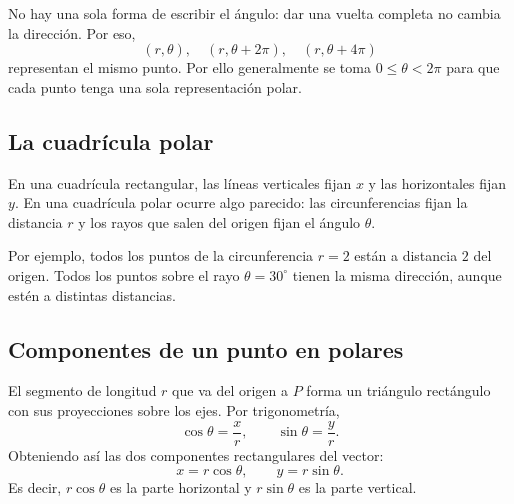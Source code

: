 No hay una sola forma de escribir el ángulo: dar una vuelta completa no cambia la dirección. Por eso,
\[
(r,\theta),\quad (r,\theta+2\pi),\quad (r,\theta+4\pi)
\]
representan el mismo punto. Por ello generalmente se toma $0\leq\theta<2\pi$ para que cada punto tenga una sola representación polar.

\subsection{La cuadrícula polar}

En una cuadrícula rectangular, las líneas verticales fijan $x$ y las horizontales fijan $y$. En una cuadrícula polar ocurre algo parecido: las circunferencias fijan la distancia $r$ y los rayos que salen del origen fijan el ángulo $\theta$.

\begin{center}
\end{center}

Por ejemplo, todos los puntos de la circunferencia $r=2$ están a distancia $2$ del origen. Todos los puntos sobre el rayo $\theta=30^\circ$ tienen la misma dirección, aunque estén a distintas distancias.

\subsection{Componentes de un punto en polares}

El segmento de longitud $r$ que va del origen a $P$ forma un triángulo rectángulo con sus proyecciones sobre los ejes. Por trigonometría,
\[
\cos\theta=\frac{x}{r},
\qquad
\sin\theta=\frac{y}{r}.
\]
Obteniendo así las dos componentes rectangulares del vector:
\[
x=r\cos\theta,
\qquad
y=r\sin\theta.
\]
Es decir, $r\cos\theta$ es la parte horizontal y $r\sin\theta$ es la parte vertical.

